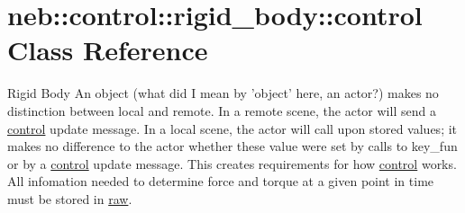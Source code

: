 \hypertarget{classneb_1_1control_1_1rigid__body_1_1control}{
\section{neb::control::rigid\_\-body::control Class Reference}
\label{classneb_1_1control_1_1rigid__body_1_1control}
}


Rigid Body An object (what did I mean by 'object' here, an actor?) makes no distinction between local and remote. In a remote scene, the actor will send a \hyperlink{classneb_1_1control_1_1rigid__body_1_1control}{control} update message. In a local scene, the actor will call upon stored values; it makes no difference to the actor whether these value were set by calls to key\_\-fun or by a \hyperlink{classneb_1_1control_1_1rigid__body_1_1control}{control} update message. This creates requirements for how \hyperlink{classneb_1_1control_1_1rigid__body_1_1control}{control} works. All infomation needed to determine force and torque at a given point in time must be stored in \hyperlink{classneb_1_1control_1_1rigid__body_1_1raw}{raw}.  


